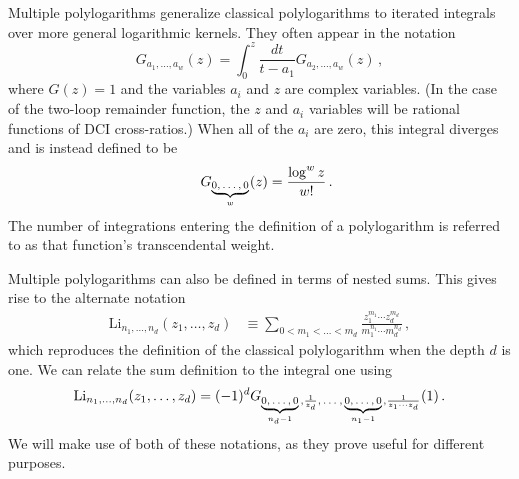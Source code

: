 \documentclass[11pt]{article}
\newcommand{\fwboxL}[2]{\text{\makebox[#1][l]{$#2$}}}
\begin{document}



Multiple polylogarithms generalize classical polylogarithms to iterated integrals over more general logarithmic kernels. They often appear in the notation
\begin{equation} \label{eq:G_notation}
G_{a_1,\dots, a_w}(z) = \int_0^z \frac{dt}{t-a_1} G_{a_2,\dots, a_w}(z)\, ,
\end{equation}
where $G(z) = 1$ and the variables $a_i$ and $z$ are complex variables. (In the case of the two-loop remainder function, the $z$ and $a_i$ variables will be rational functions of DCI cross-ratios.) When all of the $a_i$ are zero, this integral diverges and is instead defined to be
\begin{equation}
\quad G_{\fwboxL{27pt}{{\underbrace{0,\dots,0}_{w}}}}(z) = \frac{\log^w z}{w!} \, .
\end{equation}
The number of integrations entering the definition of a polylogarithm is referred to as that function's transcendental weight. 

Multiple polylogarithms can also be defined in terms of nested sums. This gives rise to the alternate notation
\begin{align} \label{eq:Li_notation}
\text{Li}_{n_1,\dots,n_d}(z_1,\dots, z_d) &\equiv \sum_{0 < m_1 < \dots < m_d} \frac{z_1^{m_1} \cdots z_d^{m_d}}{m_1^{n_1} \cdots m_d^{n_d}} \, ,
\end{align}
which reproduces the definition of the classical polylogarithm when the depth $d$ is one. We can relate the sum definition to the integral one using
\begin{align}
\text{Li}_{n_1,\dots,n_d}(z_1,\dots, z_d) = (-1)^d G_{\fwboxL{28pt}{\underbrace{0,\dots,0}_{n_d-1}},\frac{1}{z_d},\fwboxL{13pt}{\,\dots},\fwboxL{29pt}{\,\underbrace{0,\dots,0}_{n_1-1}},\frac{1}{z_1 \cdots z_d}}(1) \, .
\end{align}
We will make use of both of these notations, as they prove useful for different purposes. 
\end{document}
